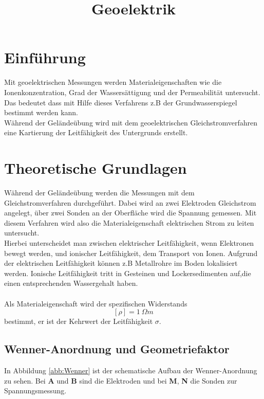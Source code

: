 \documentclass[a4paper,12pt]{scrartcl}
\begin{document}
\begin{titlepage}


\title{Geoelektrik}



\vfill
\maketitle
\end{titlepage}
\newpage
\tableofcontents
\newpage
\section{Einführung}
Mit geoelektrischen Messungen werden Materialeigenschaften wie die Ionenkonzentration, Grad der Wassersättigung und der Permeabilität untersucht. 
Das bedeutet dass mit Hilfe dieses Verfahrens z.B der Grundwasserspiegel bestimmt werden kann. \\
Während der Geländeübung wird mit dem geoelektrischen Gleichstromverfahren eine Kartierung der Leitfähigkeit des Untergrunds erstellt.

\section{Theoretische Grundlagen}
Während der Geländeübung werden die Messungen mit dem Gleichstromverfahren durchgeführt. Dabei wird an zwei Elektroden Gleichstrom angelegt,
über zwei Sonden an der Oberfläche wird die Spannung gemessen. Mit diesem Verfahren wird also die Materialeigenschaft elektrischen Strom zu leiten untersucht. \\
Hierbei unterscheidet man zwischen elektrischer Leitfähigkeit, wenn Elektronen bewegt werden, und ionischer Leitfähigkeit, dem Transport von Ionen. 
Aufgrund der elektrischen Leitfähigkeit können z.B Metallrohre im Boden lokalisiert werden. Ionische Leitfähigkeit tritt in Gesteinen und Lockersedimenten auf,die einen entsprechenden Wassergehalt haben. \\
\\
Als Materialeigenschaft wird der spezifischen Widerstands $$[\rho] = \SI{1}{\Omega m}$$ bestimmt, er ist der Kehrwert der Leitfähigkeit $\sigma$.

\subsection{Wenner-Anordnung und Geometriefaktor}
In Abbildung \ref{abb:Wenner} ist der schematische Aufbau der Wenner-Anordnung zu sehen. Bei \textbf{A} und \textbf{B} sind die Elektroden und bei \textbf{M}, \textbf{N} die Sonden zur Spannungsmessung.
\end{document}
